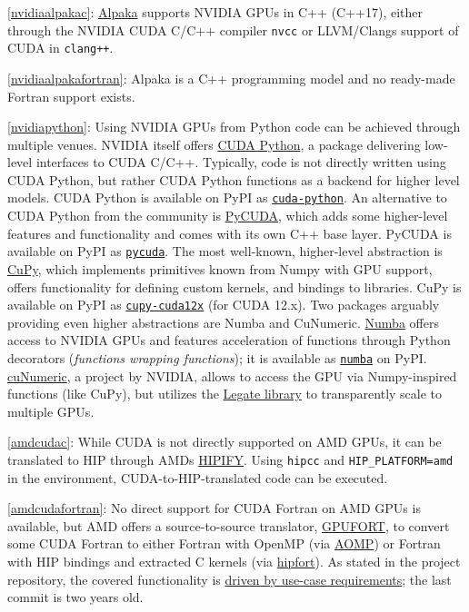 \item \ref{nvidiaalpakac}: \href{https://github.com/alpaka-group/alpaka}{Alpaka} supports NVIDIA GPUs in C++ (C++17), either through the NVIDIA CUDA C/C++ compiler \texttt{nvcc} or LLVM/Clang\textquotesingle s support of CUDA in \texttt{clang++}.
\item \ref{nvidiaalpakafortran}: Alpaka is a C++ programming model and no ready-made Fortran support exists.
\item \ref{nvidiapython}: Using NVIDIA GPUs from Python code can be achieved through multiple venues. NVIDIA itself offers \href{https://github.com/NVIDIA/cuda-python}{CUDA Python}, a package delivering low-level interfaces to CUDA C/C++. Typically, code is not directly written using CUDA Python, but rather CUDA Python functions as a backend for higher level models. CUDA Python is available on PyPI as \href{https://pypi.org/project/cuda-python/}{\texttt{cuda-python}}. An alternative to CUDA Python from the community is \href{https://github.com/inducer/pycuda}{PyCUDA}, which adds some higher-level features and functionality and comes with its own C++ base layer. PyCUDA is available on PyPI as \href{https://pypi.org/project/pycuda/}{\texttt{pycuda}}. The most well-known, higher-level abstraction is \href{https://cupy.dev/}{CuPy}, which implements primitives known from Numpy with GPU support, offers functionality for defining custom kernels, and bindings to libraries. CuPy is available on PyPI as \href{https://pypi.org/project/cupy-cuda12x/}{\texttt{cupy-cuda12x}} (for CUDA 12.x). Two packages arguably providing even higher abstractions are Numba and CuNumeric. \href{http://numba.pydata.org/}{Numba} offers access to NVIDIA GPUs and features acceleration of functions through Python decorators (\emph{functions wrapping functions}); it is available as \href{https://pypi.org/project/numba/}{\texttt{numba}} on PyPI. \href{https://github.com/nv-legate/cunumeric}{cuNumeric}, a project by NVIDIA, allows to access the GPU via Numpy-inspired functions (like CuPy), but utilizes the \href{https://github.com/nv-legate/legate.core}{Legate library} to transparently scale to multiple GPUs.
\item \ref{amdcudac}: While CUDA is not directly supported on AMD GPUs, it can be translated to HIP through AMD\textquotesingle s \href{https://github.com/ROCm-Developer-Tools/HIPIFY}{HIPIFY}. Using \texttt{hipcc} and \texttt{HIP\_PLATFORM=amd} in the environment, CUDA-to-HIP-translated code can be executed.
\item \ref{amdcudafortran}: No direct support for CUDA Fortran on AMD GPUs is available, but AMD offers a source-to-source translator, \href{https://github.com/ROCmSoftwarePlatform/gpufort}{GPUFORT}, to convert some CUDA Fortran to either Fortran with OpenMP (via \href{https://github.com/ROCm-Developer-Tools/aomp}{AOMP}) or Fortran with HIP bindings and extracted C kernels (via \href{https://github.com/ROCmSoftwarePlatform/hipfort}{hipfort}). As stated in the project repository, the covered functionality is \href{https://github.com/ROCmSoftwarePlatform/gpufort\#limitations}{driven by use-case requirements}; the last commit is two years old.
